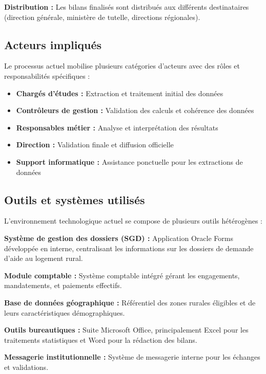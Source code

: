 \textbf{Distribution :} Les bilans finalisés sont distribués aux différents destinataires (direction générale, ministère de tutelle, directions régionales).

\subsection{Acteurs impliqués}

Le processus actuel mobilise plusieurs catégories d'acteurs avec des rôles et responsabilités spécifiques :

\begin{itemize}
    \item \textbf{Chargés d'études :} Extraction et traitement initial des données
    \item \textbf{Contrôleurs de gestion :} Validation des calculs et cohérence des données
    \item \textbf{Responsables métier :} Analyse et interprétation des résultats
    \item \textbf{Direction :} Validation finale et diffusion officielle
    \item \textbf{Support informatique :} Assistance ponctuelle pour les extractions de données
\end{itemize}

\subsection{Outils et systèmes utilisés}

L'environnement technologique actuel se compose de plusieurs outils hétérogènes :

\medskip

\textbf{Système de gestion des dossiers (SGD) :} Application Oracle Forms développée en interne, centralisant les informations sur les dossiers de demande d'aide au logement rural.

\textbf{Module comptable :} Système comptable intégré gérant les engagements, mandatements, et paiements effectifs.

\textbf{Base de données géographique :} Référentiel des zones rurales éligibles et de leurs caractéristiques démographiques.

\textbf{Outils bureautiques :} Suite Microsoft Office, principalement Excel pour les traitements statistiques et Word pour la rédaction des bilans.

\textbf{Messagerie institutionnelle :} Système de messagerie interne pour les échanges et validations.

